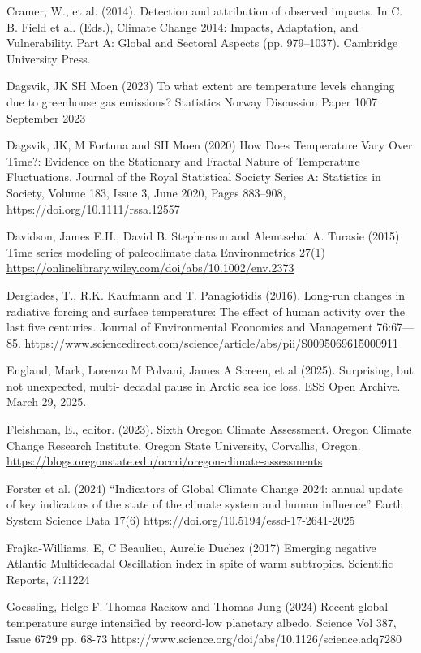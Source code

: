 \documentclass[12pt,paper=a4,DIV=12,parskip=never,chapterprefix=false,headings=standardclasses]{scrreprt}
\begin{document}
Cramer, W., et al. (2014). Detection and attribution of observed impacts. In C. B. Field et al. (Eds.),
Climate Change 2014: Impacts, Adaptation, and Vulnerability. Part A: Global and Sectoral Aspects
(pp. 979–1037). Cambridge University Press.

Dagsvik, JK SH Moen (2023) To what extent are temperature levels changing due to greenhouse gas
emissions? Statistics Norway Discussion Paper 1007 September 2023

Dagsvik, JK, M Fortuna and SH Moen (2020) How Does Temperature Vary Over Time?: Evidence on the
Stationary and Fractal Nature of Temperature Fluctuations. Journal of the Royal Statistical Society
Series A: Statistics in Society, Volume 183, Issue 3, June 2020, Pages 883–908,
https://doi.org/10.1111/rssa.12557

Davidson, James E.H., David B. Stephenson and Alemtsehai A. Turasie (2015) Time series modeling of
paleoclimate data Environmetrics 27(1) \url{https://onlinelibrary.wiley.com/doi/abs/10.1002/env.2373}

Dergiades, T., R.K. Kaufmann and T. Panagiotidis (2016). Long-run changes in radiative forcing and
surface temperature: The effect of human activity over the last five centuries. Journal of Environmental
Economics and Management 76:67—85.
https://www.sciencedirect.com/science/article/abs/pii/S0095069615000911

England, Mark, Lorenzo M Polvani, James A Screen, et al (2025). Surprising, but not unexpected, multi-
decadal pause in Arctic sea ice loss. ESS Open Archive. March 29, 2025.

Fleishman, E., editor. (2023). Sixth Oregon Climate Assessment. Oregon Climate Change Research
Institute, Oregon State University, Corvallis, Oregon. \url{https://blogs.oregonstate.edu/occri/oregon-climate-assessments}

Forster et al. (2024) “Indicators of Global Climate Change 2024: annual update of key indicators of the
state of the climate system and human influence” Earth System Science Data 17(6)
https://doi.org/10.5194/essd-17-2641-2025

Frajka-Williams, E, C Beaulieu, Aurelie Duchez (2017) Emerging negative Atlantic Multidecadal
Oscillation index in spite of warm subtropics. Scientific Reports, 7:11224

Goessling, Helge F. Thomas Rackow and Thomas Jung (2024) Recent global temperature surge
intensified by record-low planetary albedo. Science Vol 387, Issue 6729 pp. 68-73
https://www.science.org/doi/abs/10.1126/science.adq7280
\end{document}
